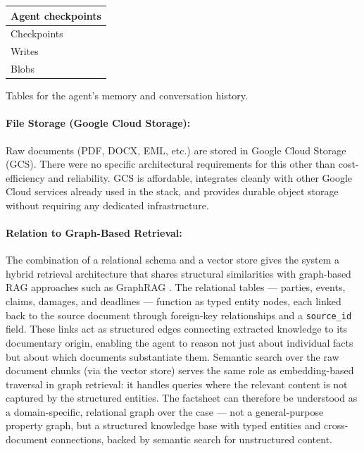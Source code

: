 \hfill
\begin{minipage}[t]{0.32\textwidth}
  \centering
  \renewcommand{\arraystretch}{1.1}
  \begin{tabular}{|l|}
    \hline
    \textbf{Agent checkpoints} \\ \hline
    Checkpoints \\ \hline
    Writes      \\ \hline
    Blobs       \\ \hline
  \end{tabular}
  
  \vspace{1em}
  
  \small Tables for the agent's memory and conversation history.
\end{minipage}

\paragraph{File Storage (Google Cloud Storage):}
Raw documents (PDF, DOCX, EML, etc.) are stored in Google Cloud Storage (GCS). There were no specific architectural requirements for this other than cost-efficiency and reliability. GCS is affordable, integrates cleanly with other Google Cloud services already used in the stack, and provides durable object storage without requiring any dedicated infrastructure.

\paragraph{Relation to Graph-Based Retrieval:}
The combination of a relational schema and a vector store gives the system a hybrid
retrieval architecture that shares structural similarities with graph-based RAG
approaches such as GraphRAG \cite{edge2025localglobalgraphrag}. The relational tables
--- parties, events, claims, damages, and deadlines --- function as typed entity nodes,
each linked back to the source document through foreign-key relationships and a
\texttt{source\_id} field. These links act as structured edges connecting extracted
knowledge to its documentary origin, enabling the agent to reason not just about
individual facts but about which documents substantiate them. Semantic search over the
raw document chunks (via the vector store) serves the same role as embedding-based
traversal in graph retrieval: it handles queries where the relevant content is not
captured by the structured entities. The factsheet can therefore be understood as a
domain-specific, relational graph over the case --- not a general-purpose property
graph, but a structured knowledge base with typed entities and cross-document
connections, backed by semantic search for unstructured content.

